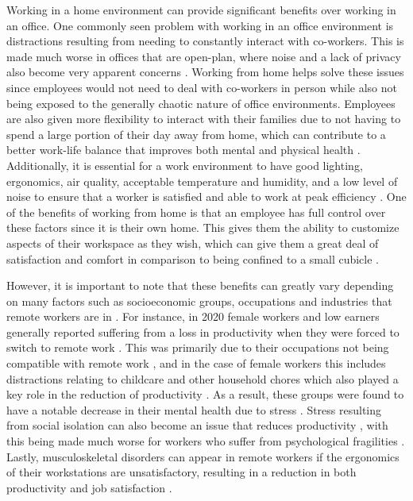 \documentclass[12pt]{article}
\begin{document}
Working in a home environment can provide significant benefits over working in an office. One commonly seen problem with working in an office environment is distractions resulting from needing to constantly interact with co-workers. This is made much worse in offices that are open-plan, where noise and a lack of privacy also become very apparent concerns \cite{Kim2013}. Working from home helps solve these issues since employees would not need to deal with co-workers in person while also not being exposed to the generally chaotic nature of office environments. Employees are also given more flexibility to interact with their families due to not having to spend a large portion of their day away from home, which can contribute to a better work-life balance that improves both mental and physical health \cite{Xiao2021}. Additionally, it is essential for a work environment to have good lighting, ergonomics, air quality, acceptable temperature and humidity, and a low level of noise to ensure that a worker is satisfied and able to work at peak efficiency \cite{Xiao2021}. One of the benefits of working from home is that an employee has full control over these factors since it is their own home. This gives them the ability to customize aspects of their workspace as they wish, which can give them a great deal of satisfaction and comfort in comparison to being confined to a small cubicle \cite{Xiao2021}.

However, it is important to note that these benefits can greatly vary depending on many factors such as socioeconomic groups, occupations and industries that remote workers are in \cite{Etheridge2020}. For instance, in 2020 female workers and low earners generally reported suffering from a loss in productivity when they were forced to switch to remote work \cite{Abi2020}. This was primarily due to their occupations not being compatible with remote work \cite{AbiTasks2020}, and in the case of female workers this includes distractions relating to childcare and other household chores which also played a key role in the reduction of productivity \cite{Chattopadhyay2021}. As a result, these groups were found to have a notable decrease in their mental health due to stress \cite{Etheridge2020}. Stress resulting from social isolation can also become an issue that reduces productivity \cite{Toscano2020}, with this being made much worse for workers who suffer from psychological fragilities \cite{Bouziri2020}. Lastly, musculoskeletal disorders can appear in remote workers if the ergonomics of their workstations are unsatisfactory, resulting in a reduction in both productivity and job satisfaction \cite{Evina2020}.
\end{document}
